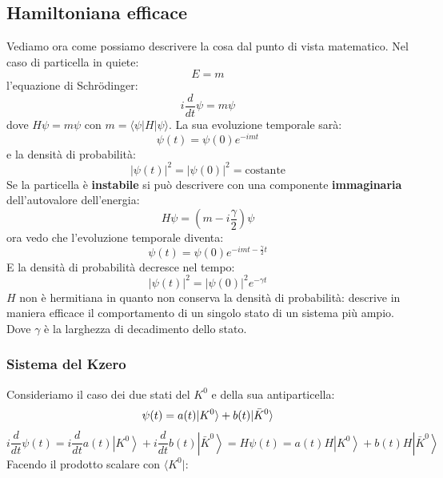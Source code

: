 \subsection{Hamiltoniana efficace}
Vediamo ora come possiamo descrivere la cosa dal punto di vista matematico. Nel caso di particella in quiete:
\begin{equation*}
    E=m
\end{equation*}
l'equazione di Schr\"odinger:
\begin{equation*}
    i\frac{d}{dt}\psi=m\psi
\end{equation*}
dove $H\psi=m\psi$ con $m=\langle \psi|H|\psi\rangle$. La sua evoluzione temporale sarà:
\begin{equation*}
    \psi(t)=\psi(0)e^{-imt}
\end{equation*}
e la densità di probabilità:
\begin{equation*}
    |\psi(t)|^2=|\psi(0)|^2=\text{costante}
\end{equation*}
Se la particella è \textbf{instabile} si può descrivere con una componente \textbf{immaginaria} dell'autovalore dell'energia:
\begin{equation*}
    H\psi=\left(m-i\frac{\gamma}{2}\right)\psi
\end{equation*}
ora vedo che l'evoluzione temporale diventa:
\begin{equation*}
    \psi(t)=\psi(0)e^{-imt-\frac{\gamma}{2}t}
\end{equation*}
E la densità di probabilità decresce nel tempo:
\begin{equation*}
    |\psi(t)|^2=|\psi(0)|^2e^{-\gamma t}
\end{equation*}
$H$ non è hermitiana in quanto non conserva la densità di probabilità: descrive in maniera efficace il comportamento di un singolo stato di un sistema più ampio. Dove $\gamma$ è la larghezza di decadimento dello stato.
\subsubsection{Sistema del Kzero}
Consideriamo il caso dei due stati del $K^0$ e della sua antiparticella:
\begin{equation*}
    \psi(t)=a(t)|K^0\rangle+b(t)|\Bar{K}^0\rangle
\end{equation*}
\begin{equation*}
    i \frac{d}{d t} \psi(t)=i \frac{d}{d t} a(t)\left|K^0\right\rangle+i \frac{d}{d t} b(t)\left|\bar{K}^0\right\rangle=H \psi(t)=a(t) H\left|K^0\right\rangle+b(t) H\left|\bar{K}^0\right\rangle
\end{equation*}
Facendo il prodotto scalare con $\langle K^0|$:

